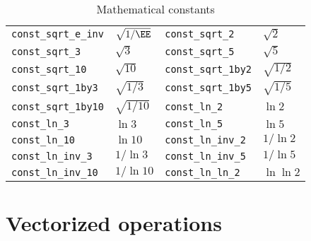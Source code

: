 \begin{table}
\begin{tabularx}{\textwidth}{XXXX}
    \verb|const_sqrt_e_inv|   & $\sqrt{1/\EE}$  &
    \verb|const_sqrt_2|       & $\sqrt{2}$      \\
    \verb|const_sqrt_3|       & $\sqrt{3}$      &
    \verb|const_sqrt_5|       & $\sqrt{5}$      \\
    \verb|const_sqrt_10|      & $\sqrt{10}$     &
    \verb|const_sqrt_1by2|    & $\sqrt{1/2}$    \\
    \verb|const_sqrt_1by3|    & $\sqrt{1/3}$    &
    \verb|const_sqrt_1by5|    & $\sqrt{1/5}$    \\
    \verb|const_sqrt_1by10|   & $\sqrt{1/10}$   &
    \verb|const_ln_2|         & $\ln{2}$        \\
    \verb|const_ln_3|         & $\ln{3}$        &
    \verb|const_ln_5|         & $\ln{5}$        \\
    \verb|const_ln_10|        & $\ln{10}$       &
    \verb|const_ln_inv_2|     & $1/\ln{2}$      \\
    \verb|const_ln_inv_3|     & $1/\ln{3}$      &
    \verb|const_ln_inv_5|     & $1/\ln{5}$      \\
    \verb|const_ln_inv_10|    & $1/\ln{10}$     &
    \verb|const_ln_ln_2|      & $\ln\ln{2}$     \\
    \bottomrule
  \end{tabularx}
  \caption{Mathematical constants}
  \label{tab:Mathematical constants}
\end{table}

\section{Vectorized operations}
\label{sec:Vectorized operations}

